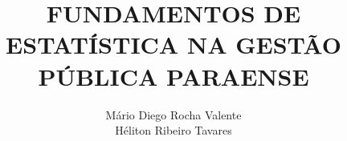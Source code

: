 

\title{FUNDAMENTOS DE ESTATÍSTICA NA GESTÃO PÚBLICA PARAENSE} 



\author{Mário Diego Rocha Valente  \\ Héliton Ribeiro Tavares }



\renewcommand{\lsISBNdigital}{000-0-000000-00-0}
\renewcommand{\lsISBNhardcover}{000-0-000000-00-0}
\renewcommand{\lsISBNsoftcover}{000-0-000000-00-0}
\renewcommand{\lsISBNsoftcoverus}{000-0-000000-00-0}
\renewcommand{\lsSeries}{cfls} %
\renewcommand{\lsSeriesNumber}{99} %


\setlength{\csspine}{25.0559784mm} %
\setlength{\bodspine}{20mm} %

